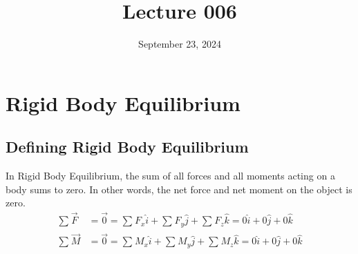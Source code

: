 \documentclass[12pt]{article}
\title{Lecture 006}
\date{September 23, 2024}
\begin{document}
\section{Rigid Body Equilibrium}
\label{sec:rigidBodyEquilibrium}

\subsection{Defining Rigid Body Equilibrium}
\label{ssec:definingRigidBodyEquilibrium}

In Rigid Body Equilibrium, the sum of all forces and all moments acting on a body sums to
zero. In other words, the net force and net moment on the object is zero.
\begin{align*}
  \sum_{}^{} \overrightarrow{F} &= \overrightarrow{0} = \sum_{}^{} F_x \hat{i} + \sum_{}^{} F_y \hat{j} + \sum_{}^{} F_z \hat{k} = 0 \hat{i} + 0 \hat{j} + 0 \hat{k} \\
  \sum_{}^{} \overrightarrow{M} &= \overrightarrow{0} = \sum_{}^{} M_x \hat{i} + \sum_{}^{} M_y \hat{j} + \sum_{}^{} M_z \hat{k} = 0 \hat{i} + 0 \hat{j} + 0 \hat{k} \\
\end{align*}
\end{document}
